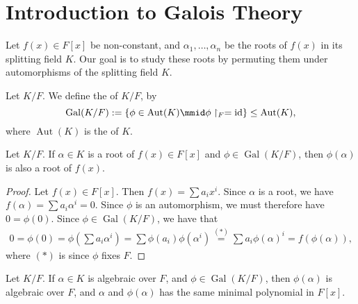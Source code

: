 \documentclass[notoc,notitlepage]{tufte-book}
\DeclareMathOperator{\Aut}{Aut}
\DeclareMathOperator{\Gal}{Gal}
\DeclareMathOperator{\id}{id}
\begin{document}

\section{Introduction to Galois Theory}%
\label{sec:introduction_to_galois_theory}

Let $f(x) \in F[x]$ be non-constant, and $\alpha_1, \ldots, \alpha_n$ be the
roots of $f(x)$ in its splitting field $K$. Our goal is to study these roots by
permuting them under automorphisms of the splitting field $K$.

\begin{defn}\label{defn:galois_group}
  Let $K / F$. We define the  of $K / F$, by
  \begin{equation*}
    \Gal(K / F) := \left\{ \phi \in \Aut(K) \mmid \phi \restriction_{F} = \id
    \right\} \leq \Aut(K),
  \end{equation*}
  where $\Aut(K)$ is the  of $K$.
\end{defn}

\begin{lemma}\label{lemma:the_galois_group_permutes_roots}
  Let $K / F$. If $\alpha \in K$ is a root of $f(x) \in F[x]$ and $\phi \in
  \Gal(K / F)$, then $\phi(\alpha)$ is also a root of $f(x)$.
\end{lemma}

\begin{proof}
  Let $f(x) \in F[x]$. Then $f(x) = \sum a_i x^i$. Since $\alpha$ is a root, we
  have $f(\alpha) = \sum a_i \alpha^i = 0$. Since $\phi$ is an automorphism, we
  must therefore have $0 = \phi(0)$. Since $\phi \in \Gal(K / F)$, we have that
  \begin{align*}
    0 = \phi(0) = \phi ( \sum a_i \alpha^i ) = \sum \phi(a_i) \phi(\alpha^i)
    \overset{(*)}{=} \sum a_i \phi(\alpha)^i = f(\phi(\alpha)),
  \end{align*}
  where $(*)$ is since $\phi$ fixes $F$.
\end{proof}

\begin{crly}\label{crly:elements_of_the_galois_group_permutes_roots_of_the_same_minimal_polynomial}
  Let $K / F$. If $\alpha \in K$ is algebraic over $F$, and $\phi \in \Gal(K /
  F)$, then $\phi(\alpha)$ is algebraic over $F$, and $\alpha$ and
  $\phi(\alpha)$ has the same minimal polynomial in $F[x]$.
\end{crly}
\end{document}

